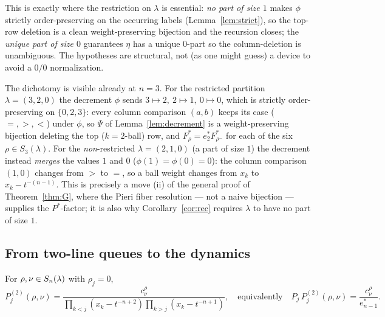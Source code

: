 This is exactly where the restriction on $\lambda$ is essential: \emph{no part of
size $1$} makes $\phi$ strictly order-preserving on the occurring labels
(Lemma~\ref{lem:strict}), so the top-row deletion is a clean weight-preserving
bijection and the recursion closes; the \emph{unique part of size $0$} guarantees
$\eta$ has a unique $0$-part so the column-deletion is unambiguous. The hypotheses
are structural, not (as one might guess) a device to avoid a $0/0$ normalization.

\begin{qthreeremark}
The dichotomy is visible already at $n=3$. For the restricted partition
$\lambda=(3,2,0)$ the decrement $\phi$ sends $3\mapsto2,\ 2\mapsto1,\ 0\mapsto0$,
which is strictly order-preserving on $\{0,2,3\}$: every column comparison
$(a,b)$ keeps its case ($=,>,<$) under $\phi$, so $\Psi$ of
Lemma~\ref{lem:decrement} is a weight-preserving bijection deleting the top
($k=2$-ball) row, and $F^*_\rho=e^*_2 F^*_{\rho^-}$ for each of the six
$\rho\in S_3(\lambda)$. For the \emph{non}-restricted $\lambda=(2,1,0)$ (a part of
size $1$) the decrement instead \emph{merges} the values $1$ and $0$
($\phi(1)=\phi(0)=0$): the column comparison $(1,0)$ changes from $>$ to $=$, so a
ball weight changes from $x_k$ to $x_k-t^{-(n-1)}$. This is precisely a move
\textup{(ii)} of the general proof of Theorem~\ref{thm:G}, where the Pieri fiber
resolution --- not a naive bijection --- supplies the $P^*$-factor; it is also why
Corollary~\ref{cor:rec} requires $\lambda$ to have no part of size $1$.
\end{qthreeremark}

\subsection*{From two-line queues to the dynamics}

\begin{qthreeproposition}\label{prop:step2}
For $\rho,\nu\in S_n(\lambda)$ with $\rho_j=0$,
\[
P^{(2)}_j(\rho,\nu)=\frac{c^\rho_\nu}{\prod_{k<j}(x_k-t^{-n+2})\prod_{k>j}(x_k-t^{-n+1})},
\quad\text{equivalently}\quad
P_j\,P^{(2)}_j(\rho,\nu)=\frac{c^\rho_\nu}{e^*_{n-1}} .
\]
\end{qthreeproposition}

